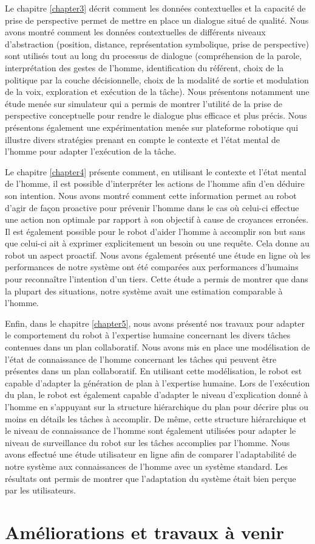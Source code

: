 \documentclass[a4paper,11pt,twoside]{StyleThese}
\begin{document}
Le chapitre \ref{chapter3} décrit comment les données contextuelles et la capacité de prise de perspective permet de mettre en place un dialogue situé de qualité. Nous avons montré comment les données contextuelles de différents niveaux d'abstraction (position, distance, représentation symbolique, prise de perspective) sont utilisés tout au long du processus de dialogue (compréhension de la parole, interprétation des gestes de l'homme, identification du référent, choix de la politique par la couche décisionnelle, choix de la modalité de sortie et modulation de la voix, exploration et exécution de la tâche).
Nous présentons notamment une étude menée sur simulateur qui a permis de montrer l'utilité de la prise de perspective conceptuelle pour rendre le dialogue plus efficace et plus précis. Nous présentons également une expérimentation menée sur plateforme robotique qui illustre divers stratégies prenant en compte le contexte et l'état mental de l'homme pour adapter l'exécution de la tâche.

Le chapitre \ref{chapter4} présente comment, en utilisant le contexte et l'état mental de l'homme, il est possible d'interpréter les actions de l'homme afin d'en déduire son intention. Nous avons montré comment cette information permet au robot d'agir de façon proactive pour prévenir l'homme dans le cas où celui-ci effectue une action non optimale par rapport à son objectif à cause de croyances erronées. Il est également possible pour le robot d'aider l'homme à accomplir son but sans que celui-ci ait à exprimer explicitement un besoin ou une requête. Cela donne au robot un aspect proactif. Nous avons également présenté une étude en ligne où les performances de notre système ont été comparées aux performances d'humains pour reconnaître l'intention d'un tiers. Cette étude a permis de montrer que dans la plupart des situations, notre système avait une estimation comparable à l'homme.

Enfin, dans le chapitre \ref{chapter5}, nous avons présenté nos travaux pour adapter le comportement du robot à l'expertise humaine concernant les divers tâches contenues dans un plan collaboratif. Nous avons mis en place une modélisation de l'état de connaissance de l'homme concernant les tâches qui peuvent être présentes dans un plan collaboratif. En utilisant cette modélisation, le robot est capable d'adapter la génération de plan à l'expertise humaine. Lors de l'exécution du plan, le robot est également capable d'adapter le niveau d'explication donné à l'homme en s'appuyant sur la structure hiérarchique du plan pour décrire plus ou moins en détails les tâches à accomplir. De même, cette structure hiérarchique et le niveau de connaissance de l'homme sont également utilisées pour adapter le niveau de surveillance du robot sur les tâches accomplies par l'homme. Nous avons effectué une étude utilisateur en ligne afin de comparer l'adaptabilité de notre système aux connaissances de l'homme avec un système standard. Les résultats ont permis de montrer que l'adaptation du système était bien perçue par les utilisateurs.


\section{Améliorations et travaux à venir}

\ifdefined{}
\else


\end{document}
